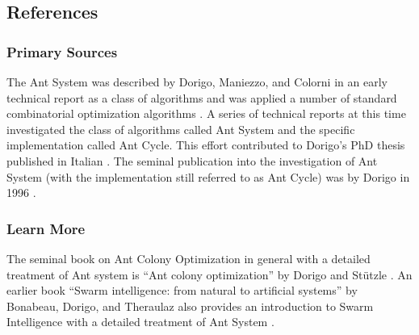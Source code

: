 

\subsection{References}

% 
% 
\subsubsection{Primary Sources}
The Ant System was described by Dorigo, Maniezzo, and Colorni in an early technical report as a class of algorithms and was applied a number of standard combinatorial optimization algorithms \cite{Dorigo1991}. A series of technical reports at this time investigated the class of algorithms called Ant System and the specific implementation called Ant Cycle. This effort contributed to Dorigo's PhD thesis published in Italian \cite{Dorigo1992}.
The seminal publication into the investigation of Ant System (with the implementation still referred to as Ant Cycle) was by Dorigo in 1996 \cite{Dorigo1996}.

% 
% 
\subsubsection{Learn More}
The seminal book on Ant Colony Optimization in general with a detailed treatment of Ant system is ``Ant colony optimization'' by Dorigo and St\"utzle \cite{Dorigo2004}. An earlier book ``Swarm intelligence: from natural to artificial systems'' by Bonabeau, Dorigo, and Theraulaz also provides an introduction to Swarm Intelligence with a detailed treatment of Ant System \cite{Bonabeau1999}.



